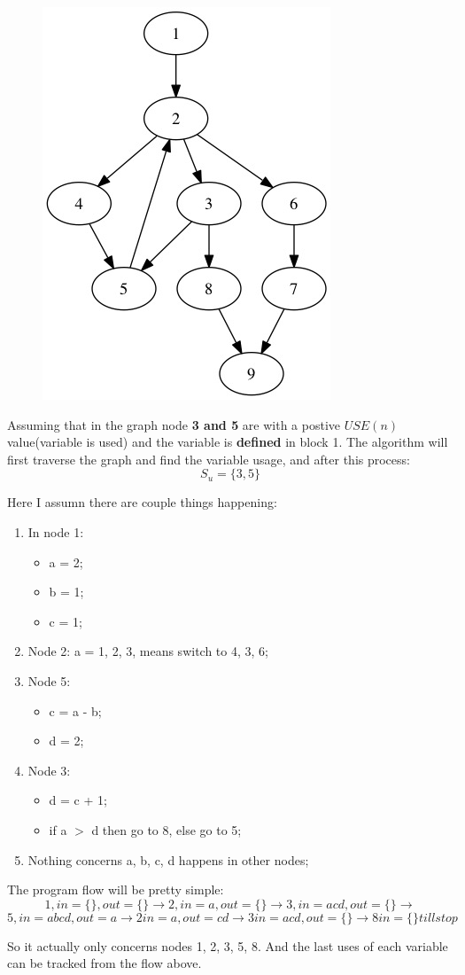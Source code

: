 \documentclass[12pt]{article}
\begin{document}
\begin{figure}
\centering
\includegraphics[scale=0.5]{example.jpg}
\end{figure}
Assuming  that in the graph node {\bf 3 and 5} are with a postive
$USE(n)$ value(variable is used) and the variable is {\bf defined} in
block 1. The algorithm will first traverse
the graph and find the variable usage, and after this process:
$$S_{u} = \{3, 5\}$$


Here I assumn there are couple things happening:
\begin{enumerate}
\item In node 1:
  \begin{itemize}
  \item a = 2;
\item b = 1;
\item c = 1;
  \end{itemize}
\item Node 2: a = 1, 2, 3, means switch to 4, 3, 6;
\item Node 5:
  \begin{itemize}
  \item c = a - b;
    \item d = 2;
  \end{itemize}
\item Node 3:
  \begin{itemize}
    \item d = c + 1;
    \item if a $>$ d then go to 8, else go to 5;
  \end{itemize}
\item Nothing concerns a, b, c, d happens in other nodes;
\end{enumerate}

The program flow will be pretty simple:
$$1, in=\{\}, out=\{\} \rightarrow 2, in=a, out=\{\}\rightarrow 3,
in=acd, out=\{\}\rightarrow$$
$$
5, in=abcd, out=a\rightarrow 2 in=a, out=cd\rightarrow
3 in=acd, out=\{\}\rightarrow 8 in=\{\}till stop$$

\vspace{4mm}
So it actually only concerns nodes 1, 2, 3, 5, 8. And the last uses of
each variable can be tracked from the flow above.
\end{document}
